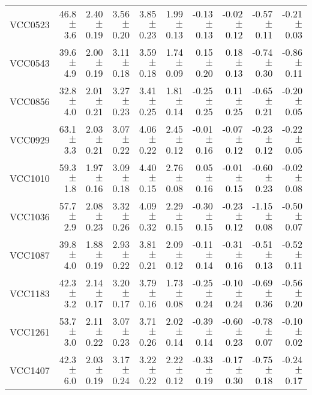 \documentclass[useAMS,usenatbib]{mn2e}
\begin{document}
\begin{table*}
\begin{threeparttable}
\begin{tabular}{|r|r|r|r|r|r|r|r|r|r|}
VCC0523&       46.8$\pm$       3.6&       2.40$\pm$      0.19&       3.56$\pm$      0.20&       3.85$\pm$      0.23&       1.99$\pm$      0.13&     -0.13$\pm$      0.13&     -0.02$\pm$      0.12&     -0.57$\pm$      0.11&     -0.21$\pm$     0.03\\
VCC0543&       39.6$\pm$       4.9&       2.00$\pm$      0.19&       3.11$\pm$      0.18&       3.59$\pm$      0.18&       1.74$\pm$      0.09&      0.15$\pm$      0.20&      0.18$\pm$      0.13&     -0.74$\pm$      0.30&     -0.86$\pm$     0.11\\
VCC0856&       32.8$\pm$       4.0&       2.01$\pm$      0.21&       3.27$\pm$      0.23&       3.41$\pm$      0.25&       1.81$\pm$      0.14&     -0.25$\pm$      0.25&      0.11$\pm$      0.25&     -0.65$\pm$      0.21&     -0.20$\pm$     0.05\\
VCC0929&       63.1$\pm$       3.3&       2.03$\pm$      0.21&       3.07$\pm$      0.22&       4.06$\pm$      0.22&       2.45$\pm$      0.12&     -0.01$\pm$      0.16&     -0.07$\pm$      0.12&     -0.23$\pm$      0.12&     -0.22$\pm$     0.05\\
VCC1010&       59.3$\pm$       1.8&       1.97$\pm$      0.16&       3.09$\pm$      0.18&       4.40$\pm$      0.15&       2.76$\pm$      0.08&      0.05$\pm$      0.16&     -0.01$\pm$      0.15&     -0.60$\pm$      0.23&     -0.02$\pm$     0.08\\
VCC1036&       57.7$\pm$       2.9&       2.08$\pm$      0.23&       3.32$\pm$      0.26&       4.09$\pm$      0.32&       2.29$\pm$      0.15&     -0.30$\pm$      0.15&     -0.23$\pm$      0.12&     -1.15$\pm$      0.08&     -0.50$\pm$     0.07\\
VCC1087&       39.8$\pm$       4.0&       1.88$\pm$      0.19&       2.93$\pm$      0.22&       3.81$\pm$      0.21&       2.09$\pm$      0.12&     -0.11$\pm$      0.14&     -0.31$\pm$      0.16&     -0.51$\pm$      0.13&     -0.52$\pm$     0.11\\
VCC1183&       42.3$\pm$       3.2&       2.14$\pm$      0.17&       3.20$\pm$      0.17&       3.79$\pm$      0.16&       1.73$\pm$      0.08&     -0.25$\pm$      0.24&     -0.10$\pm$      0.24&     -0.69$\pm$      0.36&     -0.56$\pm$     0.20\\
VCC1261&       53.7$\pm$       3.0&       2.11$\pm$      0.22&       3.07$\pm$      0.23&       3.71$\pm$      0.26&       2.02$\pm$      0.14&     -0.39$\pm$      0.14&     -0.60$\pm$      0.23&     -0.78$\pm$      0.07&     -0.10$\pm$     0.02\\
VCC1407&       42.3$\pm$       6.0&       2.03$\pm$      0.19&       3.17$\pm$      0.24&       3.22$\pm$      0.22&       2.22$\pm$      0.12&     -0.33$\pm$      0.19&     -0.17$\pm$      0.30&     -0.75$\pm$      0.18&     -0.24$\pm$     0.17\\

\end{tabular}
\end{threeparttable}
\end{table*}
\end{document}
